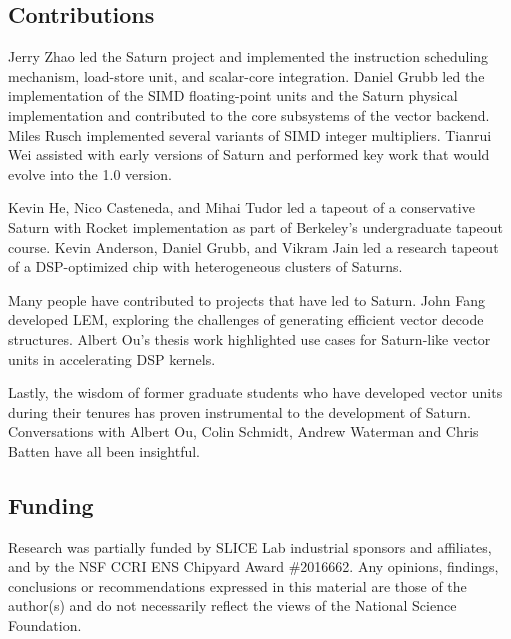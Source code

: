 \subsection{Contributions}

Jerry Zhao led the Saturn project and implemented the instruction scheduling mechanism, load-store unit, and scalar-core integration.
Daniel Grubb led the implementation of the SIMD floating-point units and the Saturn physical implementation and contributed to the core subsystems of the vector backend.
Miles Rusch implemented several variants of SIMD integer multipliers.
Tianrui Wei assisted with early versions of Saturn and performed key work that would evolve into the 1.0 version.

Kevin He, Nico Casteneda, and Mihai Tudor led a tapeout of a conservative Saturn with Rocket implementation as part of Berkeley's undergraduate tapeout course.
Kevin Anderson, Daniel Grubb, and Vikram Jain led a research tapeout of a DSP-optimized chip with heterogeneous clusters of Saturns.

Many people have contributed to projects that have led to Saturn.
John Fang developed LEM, exploring the challenges of generating efficient vector decode structures.
Albert Ou's thesis work highlighted use cases for Saturn-like vector units in accelerating DSP kernels.

Lastly, the wisdom of former graduate students who have developed vector units during their tenures has proven instrumental to the development of Saturn.
Conversations with Albert Ou, Colin Schmidt, Andrew Waterman and Chris Batten have all been insightful.

\subsection{Funding}

Research was partially funded by SLICE Lab industrial sponsors and affiliates, and by the NSF CCRI ENS Chipyard Award \#2016662.
Any opinions, findings, conclusions or recommendations expressed in this material are those of the author(s) and do not necessarily reflect the views of the National Science Foundation.
